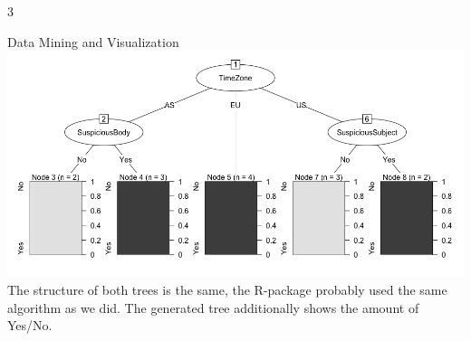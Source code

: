 \documentclass{article}
\begin{document}
\begin{ukon-infie}[15.11.17]{3}
\begin{exercise}[p=11]{Data Mining and Visualization}
\includegraphics[scale=0.5]{RWeka_decision_tree.png}\\
The structure of both trees is the same, the R-package probably used the same algorithm as we did. The generated tree additionally shows the amount of Yes/No.

		\end{exercise}

		
		
\end{ukon-infie}
\end{document}
